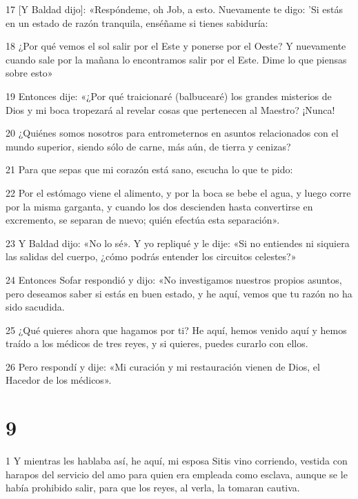 \par 17 [Y Baldad dijo]: «Respóndeme, oh Job, a esto. Nuevamente te digo: 'Si estás en un estado de razón tranquila, enséñame si tienes sabiduría:

\par 18 ¿Por qué vemos el sol salir por el Este y ponerse por el Oeste? Y nuevamente cuando sale por la mañana lo encontramos salir por el Este. Dime lo que piensas sobre esto»

\par 19 Entonces dije: «¿Por qué traicionaré (balbucearé) los grandes misterios de Dios y mi boca tropezará al revelar cosas que pertenecen al Maestro? ¡Nunca!

\par 20 ¿Quiénes somos nosotros para entrometernos en asuntos relacionados con el mundo superior, siendo sólo de carne, más aún, de tierra y cenizas?

\par 21 Para que sepas que mi corazón está sano, escucha lo que te pido:

\par 22 Por el estómago viene el alimento, y por la boca se bebe el agua, y luego corre por la misma garganta, y cuando los dos descienden hasta convertirse en excremento, se separan de nuevo; quién efectúa esta separación».

\par 23 Y Baldad dijo: «No lo sé». Y yo repliqué y le dije: «Si no entiendes ni siquiera las salidas del cuerpo, ¿cómo podrás entender los circuitos celestes?»

\par 24 Entonces Sofar respondió y dijo: «No investigamos nuestros propios asuntos, pero deseamos saber si estás en buen estado, y he aquí, vemos que tu razón no ha sido sacudida.

\par 25 ¿Qué quieres ahora que hagamos por ti? He aquí, hemos venido aquí y hemos traído a los médicos de tres reyes, y si quieres, puedes curarlo con ellos.

\par 26 Pero respondí y dije: «Mi curación y mi restauración vienen de Dios, el Hacedor de los médicos».

\chapter{9}

\par 1 Y mientras les hablaba así, he aquí, mi esposa Sitis vino corriendo, vestida con harapos del servicio del amo para quien era empleada como esclava, aunque se le había prohibido salir, para que los reyes, al verla, la tomaran cautiva.

